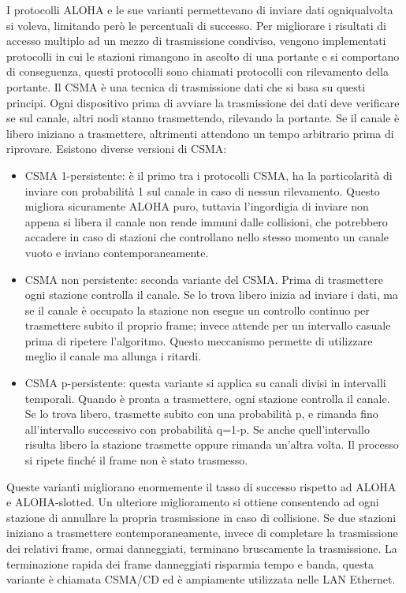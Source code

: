 I protocolli ALOHA e le sue varianti permettevano di inviare dati ogniqualvolta si voleva, limitando però le percentuali di successo. Per migliorare i risultati di accesso multiplo ad un mezzo di trasmissione condiviso, vengono implementati protocolli in cui le stazioni rimangono in ascolto di una portante e si comportano di conseguenza, questi protocolli sono chiamati protocolli con rilevamento della portante.
Il CSMA è una tecnica di trasmissione dati che si basa su questi principi. Ogni dispositivo prima di avviare la trasmissione dei dati deve verificare se sul canale, altri nodi stanno trasmettendo, rilevando la portante. Se il canale è libero iniziano a trasmettere, altrimenti attendono un tempo arbitrario prima di riprovare.
Esistono diverse versioni di CSMA:
\begin{itemize}
\item	CSMA 1-persistente: è il primo tra i protocolli CSMA, ha la particolarità di inviare con probabilità 1 sul canale in caso di nessun rilevamento. Questo migliora sicuramente ALOHA puro, tuttavia l’ingordigia di inviare non appena si libera il canale non rende immuni dalle collisioni, che potrebbero accadere in caso di stazioni che controllano nello stesso momento un canale vuoto e inviano contemporaneamente.
\item	CSMA non persistente: seconda variante del CSMA. Prima di trasmettere ogni stazione controlla il canale. Se lo trova libero inizia ad inviare i dati, ma se il canale è occupato la stazione non esegue un controllo continuo per trasmettere subito il proprio frame; invece attende per un intervallo casuale prima di ripetere l’algoritmo. Questo meccanismo permette di utilizzare meglio il canale ma allunga i ritardi.
\item	CSMA p-persistente: questa variante si applica su canali divisi in intervalli temporali. Quando è pronta a trasmettere, ogni stazione controlla il canale. Se lo trova libero, trasmette subito con una probabilità p, e rimanda fino all’intervallo successivo con probabilità q=1-p. Se anche quell’intervallo risulta libero la stazione trasmette oppure rimanda un’altra volta. Il processo si ripete finché il frame non è stato trasmesso.
\end{itemize}
Queste varianti migliorano enormemente il tasso di successo rispetto ad ALOHA e ALOHA-slotted.
Un ulteriore miglioramento si ottiene consentendo ad ogni stazione di annullare la propria trasmissione in caso di collisione. Se due stazioni iniziano a trasmettere contemporaneamente, invece di completare la trasmissione dei relativi frame, ormai danneggiati, terminano bruscamente la trasmissione. La terminazione rapida dei frame danneggiati risparmia tempo e banda, questa variante è chiamata CSMA/CD ed è ampiamente utilizzata nelle LAN Ethernet.

